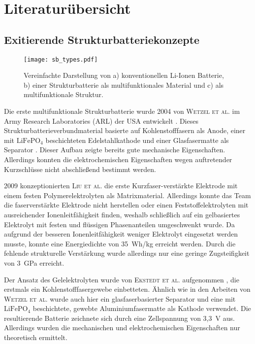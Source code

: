 \section{\label{sec:Literaturübersicht}Literaturübersicht}

\subsection{Exitierende Strukturbatteriekonzepte}

\begin{figure}[ht]
        \center
	\texttt{[image: sb\_types.pdf]}
		\caption{\label{fig:sb_types}Vereinfachte Darstellung von a) konventionellen Li-Ionen Batterie, b) einer Strukturbatterie als multifunktionales Material und c) als multifunktionale Struktur.}
\end{figure}

Die erste multifunktionale Strukturbatterie wurde 2004 von \textsc{Wetzel et al.} im Army Research Laboratories (ARL) der USA entwickelt \cite{Wetzel2004, Snyder2006, Wong2007, Snyder2007}. Dieses Strukturbatterieverbundmaterial basierte auf Kohlenstofffasern als Anode, einer mit $\text{LiFePO}_\text{4}$ beschichteten Edelstahlkathode und einer Glasfasermatte als Separator \cite{Wong2007}. Dieser Aufbau zeigte bereits gute mechanische Eigenschaften. Allerdings konnten die elektrochemischen Eigenschaften wegen auftretender Kurzschlüsse nicht abschließend bestimmt werden.

2009 konzeptionierten \textsc{Liu et al.} \cite{Liu2009} die erste Kurzfaser-verstärkte Elektrode mit einem festen Polymerelektrolyten als Matrixmaterial. Allerdings konnte das Team die faserverstärkte Elektrode nicht herstellen oder einen Feststoffelektrolyten mit ausreichender Ionenleitfähigkeit finden, weshalb schließlich auf ein gelbasiertes Elektrolyt mit festen und flüssigen Phasenanteilen umgeschwenkt wurde. Da aufgrund der besseren Ionenleitfähigkeit weniger Elektrolyt eingesetzt werden musste, konnte eine Energiedichte von 35~Wh/kg erreicht werden. Durch die fehlende strukturelle Verstärkung wurde allerdings nur eine geringe Zugsteifigkeit von 3~GPa erreicht.

Der Ansatz des Gelelektrolyten wurde von \textsc{Ekstedt et al.} aufgenommen \cite{Ekstedt2010}, die erstmals ein Kohlenstofffasergewebe einbetteten. Ähnlich wie in den Arbeiten von \textsc{Wetzel et al.} wurde auch hier ein glasfaserbasierter Separator und eine mit $\text{LiFePO}_\text{4}$ beschichtete, gewebte Aluminiumfasermatte als Kathode verwendet. Die resultierende Batterie zeichnete sich durch eine Zellspannung von 3,3~V aus. Allerdings wurden die mechanischen und elektrochemischen Eigenschaften nur theoretisch ermittelt.

